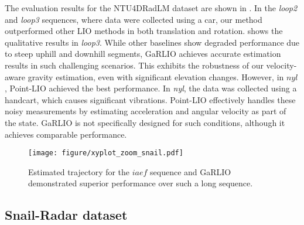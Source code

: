 The evaluation results for the NTU4DRadLM dataset are shown in . In the \textit{loop2} and \textit{loop3} sequences, where data were collected using a car, our method outperformed other LIO methods in both translation and rotation.  shows the qualitative results in \textit{loop3}. While other baselines show degraded performance due to steep uphill and downhill segments, GaRLIO achieves accurate estimation results in such challenging scenarios. This exhibits the robustness of our velocity-aware gravity estimation, even with significant elevation changes.
However, in $\textit{nyl}$, Point-LIO achieved the best performance.
In \textit{nyl}, the data was collected using a handcart, which causes significant vibrations.
Point-LIO effectively handles these noisy measurements by estimating acceleration and angular velocity as part of the state.
GaRLIO is not specifically designed for such conditions, although it achieves comparable performance.

% 


\begin{figure}[!t]
    \centering
    \texttt{[image: figure/xyplot\_zoom\_snail.pdf]}
    \caption{Estimated trajectory for the $\textit{iaef}$ sequence and GaRLIO demonstrated superior performance over such a long sequence. 
 }
    \label{fig:iaef_traj}
    \vspace{-7mm}
\end{figure}




\subsection{Snail-Radar dataset}
\label{subsec:snail}


